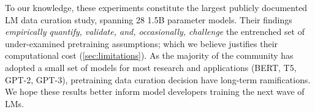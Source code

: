 \documentclass{article}
\begin{document}
To our knowledge, these experiments constitute the largest publicly documented LM data curation study, spanning 28 1.5B parameter models.
Their findings \emph{empirically quantify, validate, and, occasionally, challenge} the entrenched set of under-examined pretraining assumptions; which we believe justifies their computational cost (\cref{sec:limitations}).
As the majority of the community has adopted a small set of models for most research and applications (BERT, T5, GPT-2, GPT-3), pretraining data curation decision have long-term ramifications.
We hope these results better inform model developers training the next wave of LMs.



\end{document}

